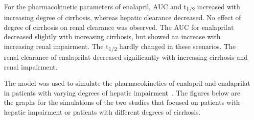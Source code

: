 \documentclass[pharmaceutics,article,submit,pdftex,moreauthors]{Definitions/mdpi}
\begin{document}

For the pharmacokinetic parameters of enalapril, AUC and t\textsubscript{1/2} increased with increasing degree of cirrhosis, whereas hepatic clearance decreased. No effect of degree of cirrhosis on renal clearance was observed. The AUC for enalaprilat decreased slightly with increasing cirrhosis, but showed an increase with increasing renal impairment. The t\textsubscript{1/2} hardly changed in these scenarios. The renal clearance of enalaprilat decreased significantly with increasing cirrhosis and renal impairment.

The model was used to simulate the pharmacokinetics of enalapril and enalaprilat in patients with varying degrees of hepatic impairment~\cite{Baba1990, Ohnishi1989}. The figures below are the graphs for the simulations of the two studies that focused on patients with hepatic impairment or patients with different degrees of cirrhosis.

\end{document}
